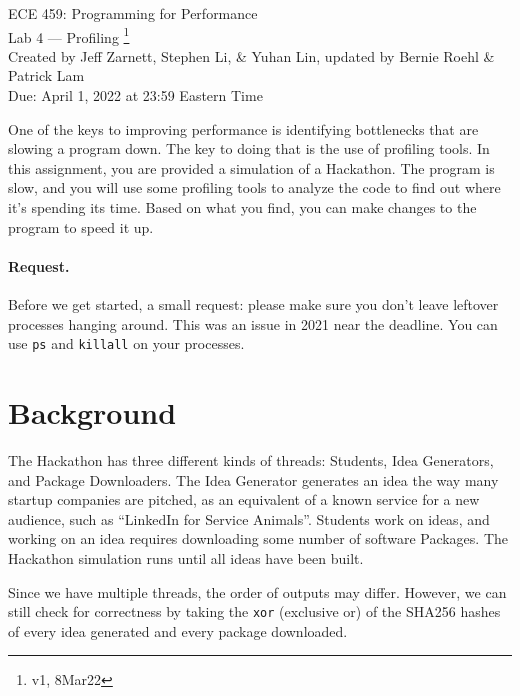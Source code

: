 



\begin{center}
{\Large ECE 459: Programming for Performance}\\
{\Large Lab 4 --- Profiling \footnote{v1, 8Mar22}}\\[1em]
{
Created by Jeff Zarnett, Stephen Li, \& Yuhan Lin, updated by Bernie Roehl \& Patrick Lam
}\\
Due: April 1, 2022 at 23:59 Eastern Time
\end{center}


One of the keys to improving performance is identifying bottlenecks that are slowing a program down. The key to doing that is the use of profiling tools. In this assignment, you are provided a simulation of a Hackathon. The program is slow,  and you will use some profiling tools to analyze the code to find out where it's spending its time. Based on what you find, you can make changes to the program to speed it up. 

\paragraph{Request.} Before we get started, a small request: please make sure you don't leave leftover processes hanging around. This was an issue in 2021 near the deadline. You can use \texttt{ps} and \texttt{killall} on your processes.

\section*{Background}


The Hackathon has three different kinds of threads: Students, Idea Generators, and Package Downloaders. The Idea Generator generates an idea the way many startup companies are pitched, as an equivalent of a known service for a new audience, such as ``LinkedIn for Service Animals''. Students work on ideas, and working on an idea requires downloading some number of software Packages. The Hackathon simulation runs until all ideas have been built. 


Since we have multiple threads, the order of outputs may differ. However, we can still check for correctness by taking the \texttt{xor} (exclusive or) of the SHA256 hashes of every idea generated and every package downloaded. 

